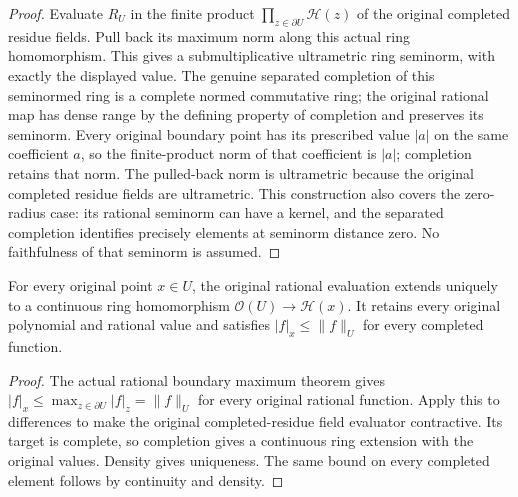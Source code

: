 \begin{proof}
Evaluate $R_U$ in the finite product $\prod_{z\in\partial U}\mathcal H(z)$
of the original completed residue fields. Pull back its maximum norm along
this actual ring homomorphism. This gives a submultiplicative ultrametric
ring seminorm, with exactly the displayed value. The genuine separated
completion of this seminormed ring is a complete normed commutative ring;
the original rational map has dense range by the defining property of
completion and preserves its seminorm. Every original boundary point has its
prescribed value $|a|$ on the same coefficient $a$, so the finite-product norm
of that coefficient is $|a|$; completion retains that norm. The pulled-back
norm is ultrametric because the original completed residue fields are
ultrametric. This construction also covers the
zero-radius case: its rational seminorm can have a kernel, and the separated
completion identifies precisely elements at seminorm distance zero.
No faithfulness of that seminorm is assumed.
\end{proof}

\begin{lemma}\label{lem:fc-line-completed-evaluation}
\leanok
{}
For every original point $x\in U$, the original rational evaluation extends
uniquely to a continuous ring homomorphism
$\mathcal O(U)\to\mathcal H(x)$. It retains every original polynomial and
rational value and satisfies $|f|_x\le\|f\|_U$ for every completed function.
\end{lemma}
\begin{proof}
The actual rational boundary maximum theorem gives
$|f|_x\le\max_{z\in\partial U}|f|_z=\|f\|_U$ for every original rational
function. Apply this to differences to make the original completed-residue
field evaluator contractive. Its target is complete, so completion gives a
continuous ring extension with the original values. Density gives uniqueness.
The same bound on every completed element follows by continuity and density.
\end{proof}

